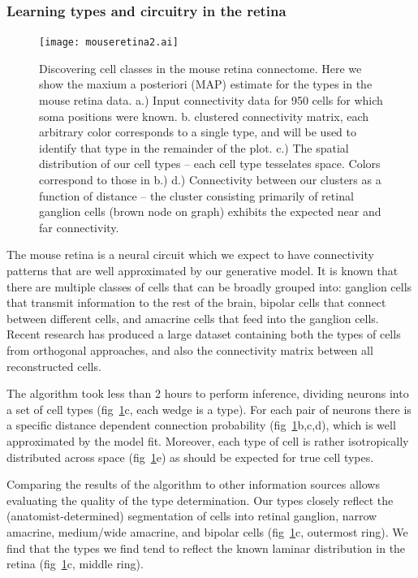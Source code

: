 \documentclass{article}
\begin{document}
\subsubsection*{Learning types and circuitry in the retina}

\begin{figure}
  \centering 
  \centerline{\texttt{[image: mouseretina2.ai]}}
  \caption{Discovering cell classes in the mouse retina connectome. Here
we show the maxium a posteriori (MAP) estimate for the types in the mouse
retina data. 
    a.) Input connectivity data for 950 cells for which soma positions
    were known. b. clustered connectivity matrix, each arbitrary color
    corresponds to a single type, and will be used to identify that type in the remainder
    of the plot. c.)  The spatial distribution of our cell types
    -- each cell type tesselates space. Colors correspond to those in b.)
    d.) Connectivity between our clusters as a function
    of distance -- the cluster consisting primarily of retinal
    ganglion cells (brown node on graph) exhibits the expected near and
    far connectivity.}
\label{fig:mouseretina}
\end{figure}

The mouse retina \autocite{Masland2001} is a neural circuit which we
expect to have connectivity patterns that are well approximated by our
generative model. It is known that there are multiple classes of cells
that can be broadly grouped into: ganglion cells that transmit
information to the rest of the brain, bipolar cells that connect
between different cells, and amacrine cells that feed into the
ganglion cells. Recent research \autocite{Helmstaedter2013} has
produced a large dataset containing both the types of cells from
orthogonal approaches, and also the connectivity matrix between all
reconstructed cells.

The algorithm took less than 2 hours to perform inference, dividing
neurons into a set of cell types (fig~\ref{fig:mouseretina}c, each
wedge is a type). For each pair of neurons there is a specific
distance dependent connection probability
(fig~\ref{fig:mouseretina}b,c,d), which is well approximated by the
model fit. Moreover, each type of cell is rather isotropically
distributed across space (fig~\ref{fig:mouseretina}e) as should be
expected for true cell types.

Comparing the results of the algorithm to other information sources
allows evaluating the quality of the type determination. Our types
closely reflect the (anatomist-determined) segmentation of cells into
retinal ganglion, narrow amacrine, medium/wide amacrine, and bipolar
cells (fig~\ref{fig:mouseretina}c, outermost ring). We find that the
types we find tend to reflect the known laminar distribution in the
retina (fig~\ref{fig:mouseretina}c, middle ring). 
\end{document}
